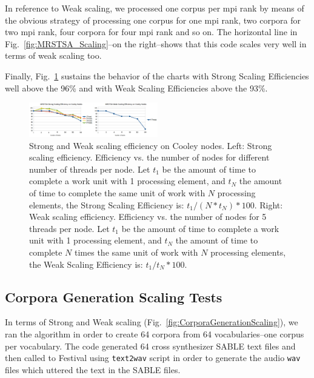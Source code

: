 \documentclass[10pt,journal,compsoc]{IEEEtran}
\begin{document}
In reference to Weak scaling, we processed one corpus per \gls{mpi} rank by means of the obvious strategy of processing one corpus for one \gls{mpi} rank, two corpora for two \gls{mpi} rank, four corpora for four \gls{mpi} rank and so on. The horizontal line in Fig.~\ref{fig:MRSTSA_Scaling}--on the right--shows that this code scales very well  in terms of weak scaling too.

Finally, Fig.~\ref{fig:MRSTSA_Scaling_Efficiency} sustains the behavior of the charts with Strong Scaling Efficiencies well above the 96\% and with Weak Scaling Efficiencies above the 93\%.

\begin{figure}[h!]
    \centering
    \includegraphics[width=0.5\textwidth]{MRSTSA_Scaling_Efficiency.png}
    \caption{Strong and Weak scaling efficiency on Cooley nodes. Left: Strong scaling efficiency. Efficiency vs. the number of nodes for different number of threads per node. Let $t_1$ be the amount of time to complete a work unit with 1 processing element, and $t_N$ the amount of time to complete the same unit of work with $N$ processing elements, the Strong Scaling Efficiency is: $t_1 / (N * t_N) * 100$. Right: Weak scaling efficiency. Efficiency vs. the number of nodes for 5 threads per node. Let $t_1$ be the amount of time to complete a work unit with 1 processing element, and $t_N$ the amount of time to complete $N$ times the same unit of work with $N$ processing elements, the Weak Scaling Efficiency is: $t_1 / t_N * 100$.}
    \label{fig:MRSTSA_Scaling_Efficiency}
\end{figure}
















\subsection{Corpora Generation Scaling Tests}

In terms of Strong and Weak scaling (Fig.~\ref{fig:CorporaGenerationScaling}), we ran the algorithm in order to create 64 corpora from 64 vocabularies--one corpus per vocabulary. The code generated 64 cross synthesizer SABLE text files and then called to Festival using \texttt{text2wav} script in order to generate the audio \texttt{wav} files which uttered the text in the SABLE files.
\end{document}
